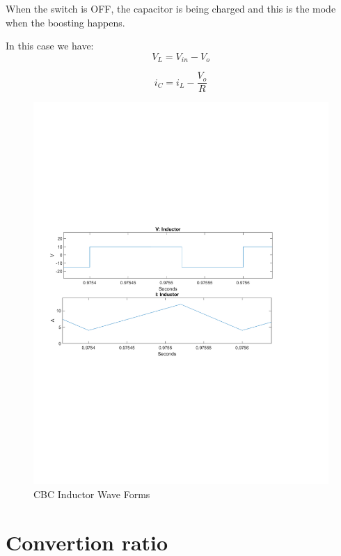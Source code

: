 When the switch is OFF,
the capacitor is being charged and this is the mode when the boosting happens.

In this case we have:
\begin{equation}
	V_L = V_{in} - V_o
	\label{eq:pumpHeadModel}
\end{equation}

\begin{equation}
	i_C = i_L -\frac{V_o}{R}
	\label{eq:pumpHeadModel}
\end{equation}

\begin{figure}[H]
   \centering
   \includegraphics[width=\textwidth]{figures/aConventionalBoost/LvAndLi.pdf}
    \caption{CBC Inductor Wave Forms}
	\label{fig:ConventionalBoostOFF}
\end{figure}

\section{Convertion ratio}\label{sec:SON}

